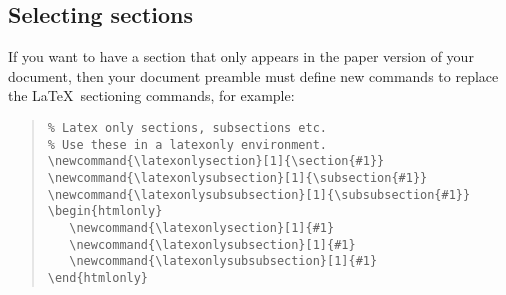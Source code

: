 \documentclass[twoside,11pt]{article}
\newenvironment{latexonly}{}{}
\newcommand{\xlabel}[1]{}
\renewcommand{\_}{\texttt{\symbol{95}}}
\begin{document}
\subsection{\xlabel{selecting_sections}\label{selecting_sections}Selecting sections}

If you want to have a section that only appears in the paper version
of your document, then your document preamble must define new commands
to replace the \LaTeX\ sectioning commands, for example:

\begin{latexonly}
\begin{quote}
\begin{verbatim}
% Latex only sections, subsections etc.
% Use these in a latexonly environment.
\newcommand{\latexonlysection}[1]{\section{#1}}
\newcommand{\latexonlysubsection}[1]{\subsection{#1}}
\newcommand{\latexonlysubsubsection}[1]{\subsubsection{#1}}
\begin{htmlonly}
   \newcommand{\latexonlysection}[1]{#1}
   \newcommand{\latexonlysubsection}[1]{#1}
   \newcommand{\latexonlysubsubsection}[1]{#1}
\end{htmlonly}
\end{verbatim}
\end{quote}
\end{latexonly}
\end{document}
